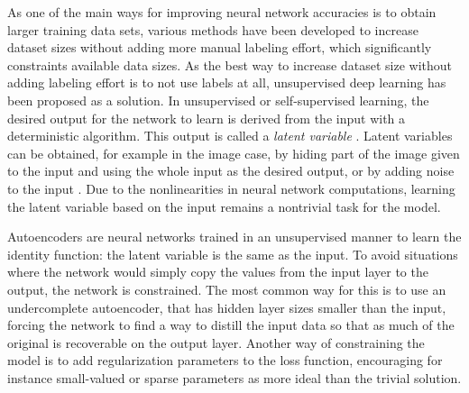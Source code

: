 \documentclass{article}
\begin{document}
As one of the main ways for improving neural network accuracies is to obtain larger training data 
sets, various methods have been developed to increase dataset sizes without adding more manual labeling 
effort, which significantly constraints available data sizes. As the best way to increase dataset 
size without adding labeling effort is to not use labels at all, unsupervised deep learning has been proposed 
as a solution. In unsupervised or self-supervised learning, the desired output for the network to learn is 
derived from the input with a deterministic algorithm. This output is called a \textit{latent variable} \cite{goodfellow}.
Latent variables can be obtained, for example in the image case, by hiding part of the image given to the input 
and using the whole input as the desired output, or by adding noise to the input \cite{princebook}.
Due to the nonlinearities in neural network computations, learning the latent variable 
based on the input remains a nontrivial task for the model.

Autoencoders are neural networks trained in an unsupervised manner to learn the identity function: the latent 
variable is the same as the input. To avoid situations where the network would simply copy the values from 
the input layer to the output, the network is constrained. The most common way for this is to use an undercomplete
autoencoder, that has hidden layer sizes smaller than the input, forcing the network to find a way to distill 
the input data so that as much of the original is recoverable on the output layer.
Another way of constraining the model is to add regularization parameters to the 
loss function, encouraging for instance small-valued or sparse parameters as more 
ideal than the trivial solution.
		
\end{document}
